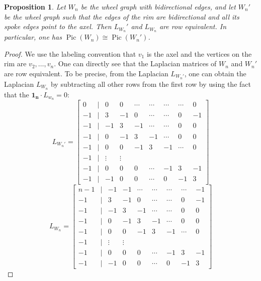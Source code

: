 \documentclass[11pt,reqno]{amsart}
\DeclareMathOperator{\Pic}{Pic}
\theoremstyle{definition}
\theoremstyle{plain}
\newtheorem{proposition}[mydef]{Proposition}
\begin{document}
\begin{proposition}
Let $W_n$ be the wheel graph with bidirectional edges, and let $W_n'$ be the wheel graph such that the edges of the rim are bidirectional and all its spoke edges point to the axel. 
Then $L_{W_n}'$ and $L_{W_n}$ are row equivalent. In particular, one has $\Pic (W_n) \cong \Pic (W_n')$.
\end{proposition}

\begin{proof}
We use the labeling convention that $v_1$ is the axel and the vertices on the rim are $v_2, \dots, v_{n}$. One can directly see that the Laplacian matrices of $W_n$ and $W_n'$ are row equivalent. To be precise, from the Laplacian $L_{W_n'}$, one can obtain the Laplacian $L_{W_n}$ by subtracting all other rows from the first row by using the fact that the $\mathbf{1_n} \cdot L_{w_n} = 0$:
\[
	L_{W_n'} = \begin{bmatrix}
		0 & | & 0 & 0 & \cdots & \cdots & \cdots & \cdots & 0 \\
		\hline
		-1 & | & 3 & -1 & 0 & \cdots & \cdots & 0 & -1 \\
		-1 & | & - 1& 3 & -1 & \cdots & \cdots & 0 & 0 \\
		-1 & | & 0 & - 1& 3 & -1 & \cdots & 0 & 0 \\
		-1 & | & 0 & 0 & - 1& 3 & -1 & \cdots & 0 \\
		-1 & | & \vdots & \vdots \\
		-1 & | & 0 & 0 & 0 & \cdots & -1& 3 & -1 \\
		-1 & | & -1 & 0 & 0 & \cdots& 0 & -1 & 3 
	\end{bmatrix}
\]
\[
L_{W_n} = \begin{bmatrix}
		n-1 & | & -1 & -1 & \cdots & \cdots & \cdots & \cdots & -1 \\
		\hline
		-1 & | & 3 & -1 & 0 & \cdots & \cdots & 0 & -1 \\
		-1 & | & - 1& 3 & -1 & \cdots & \cdots & 0 & 0 \\
		-1 & | & 0 & - 1& 3 & -1 & \cdots & 0 & 0 \\
		-1 & | & 0 & 0 & - 1& 3 & -1 & \cdots & 0 \\
		-1 & | & \vdots & \vdots \\
		-1 & | & 0 & 0 & 0 & \cdots & -1& 3 & -1 \\
		-1 & | & -1 & 0 & 0 & \cdots& 0 & -1 & 3 
	\end{bmatrix}
\]

\end{proof}
\end{document}
